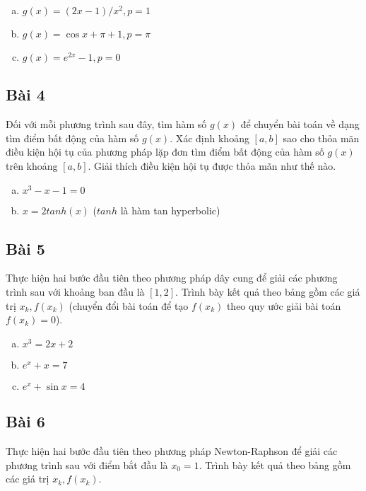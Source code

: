 \documentclass[12pt]{article}
\begin{document}
\begin{enumerate}[a)]
\item $g(x) = (2x-1)/x^2, p = 1$

\item $g(x) = \cos x + \pi + 1, p = \pi$

\item $g(x) = e^{2x} - 1, p = 0$

\end{enumerate}

\subsection{Bài 4}
Đối với mỗi phương trình sau đây, tìm hàm số $g(x)$ để chuyển bài toán về dạng tìm điểm bất động của hàm số $g(x)$. Xác định khoảng $[a,b]$ sao cho thỏa mãn điều kiện hội tụ của phương pháp lặp đơn tìm điểm bất động của hàm số $g(x)$ trên khoảng $[a,b]$. Giải thích điều kiện hội tụ được thỏa mãn như thế nào.

\begin{enumerate}[a)]
\item $x^3-x-1=0$

\item $x=2tanh(x)$ ($tanh$ là hàm tan hyperbolic)

\end{enumerate}


\subsection{Bài 5}
Thực hiện hai bước đầu tiên theo phương pháp dây cung để giải các phương trình sau với khoảng ban đầu là $[1,2]$. Trình bày kết quả theo bảng gồm các giá trị $x_k, f(x_k)$ (chuyển đổi bài toán để tạo $f(x_k)$ theo quy ước giải bài toán $f(x_k)=0$).

\begin{enumerate}[a)]
\item $x^3 = 2x + 2$

\item $e^x + x = 7$

\item $e^x + \sin x = 4$

\end{enumerate}

\subsection{Bài 6}
Thực hiện hai bước đầu tiên theo phương pháp Newton-Raphson để giải các phương trình sau với điểm bắt đầu là $x_0 = 1$. Trình bày kết quả theo bảng gồm các giá trị $x_k, f(x_k)$.
\end{document}
